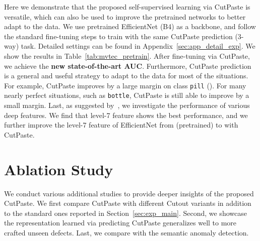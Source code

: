 \documentclass[final]{cvpr}
\begin{document}
Here we demonstrate that the proposed self-supervised learning via CutPaste is versatile, which can also be used to improve the pretrained networks to better adapt to the data. 
We use pretrained EfficientNet (B4) as a backbone, and follow the standard fine-tuning steps to train with the same CutPaste prediction (3-way) task. Detailed settings can be found in Appendix~\ref{sec:app_detail_exp}. We show the results in Table~\ref{tab:mvtec_pretrain}. 
After fine-tuning via CutPaste, we achieve the {\bf new state-of-the-art  AUC}. Furthermore, CutPaste prediction is a general and useful strategy to adapt to the data for most of the situations. For example, CutPaste improves by a large margin on class \texttt{pill} (). For many nearly perfect situations, such as \texttt{bottle}, CutPaste is still able to improve by a small margin.
Last, as suggested by~\cite{lee2018simple,rippel2020modeling}, we investigate the performance of various deep features. We find that level-7 feature shows the best performance, and we further improve the level-7 feature of EfficientNet from  (pretrained) to {\scriptsize{}} with CutPaste. 




\section{Ablation Study}
\label{sec:abl}
We conduct various additional studies to provide deeper insights of the proposed CutPaste. 
We first compare CutPaste with different Cutout variants in addition to the standard ones reported in Section~\ref{sec:exp_main}. Second, we showcase the representation learned via predicting CutPaste generalizes well to more crafted unseen defects. Last, we compare with the semantic anomaly detection.


\begin{table}[t]
    \centering
    \caption{Detection AUCs of representations trained to predict Cutout, with mean pixel value, with random color, Confetti noise~\cite{liznerski2020explainable}, or the proposed CutPaste.}
    \label{tab:cutout_to_cutpaste}
    \vspace{-0.1in}
    \vspace{-0.1in}
\end{table}
\end{document}
